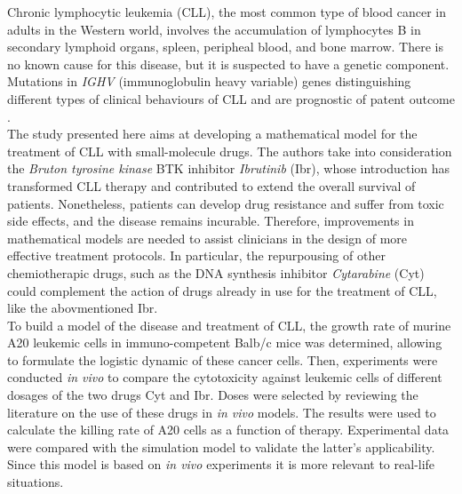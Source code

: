 Chronic lymphocytic leukemia (CLL), the most common type of blood cancer in adults in the Western world, involves the accumulation of lymphocytes B in secondary lymphoid organs, spleen, peripheal blood, and bone marrow. \cite{cll-burger-med, cll-rozman-med}  There is no known cause for this disease, but it is suspected to have a genetic component. Mutations in \textit{IGHV} (immunoglobulin heavy variable) genes distinguishing different types of clinical behaviours of CLL and are prognostic of patent outcome \cite{immunogl-med}.\\
The study presented here \cite{main-paper} aims at developing a mathematical model for the treatment of CLL with small-molecule drugs. The authors take into consideration the \textit{Bruton tyrosine kinase} BTK inhibitor \textit{Ibrutinib} (Ibr), whose introduction has transformed CLL therapy and contributed to extend the overall survival of patients.
Nonetheless, patients can develop drug resistance and suffer from toxic side effects, and the disease remains incurable. Therefore, improvements in mathematical models are needed to assist clinicians in the design of more effective treatment protocols. In particular, the repurpousing of other chemiotherapic drugs, such as the DNA synthesis inhibitor \textit{Cytarabine} (Cyt) could complement the action of drugs already in use for the treatment of CLL, like the abovmentioned Ibr.\\
To build a model of the disease and treatment of CLL, the growth rate of murine A20 leukemic cells in immuno-competent Balb/c mice was determined, allowing to formulate the logistic dynamic of these cancer cells. 
Then, experiments were conducted \textit{in vivo} to compare the cytotoxicity against leukemic cells of different dosages of the two drugs Cyt and Ibr. Doses were selected by reviewing the literature on the use of these drugs in \textit{in vivo} models. The results were used to calculate the killing rate of A20 cells as a function of therapy. 
Experimental data were compared with the simulation model to validate the latter’s applicability. Since this model is based on \textit{in vivo} experiments it is more relevant to real-life situations.

